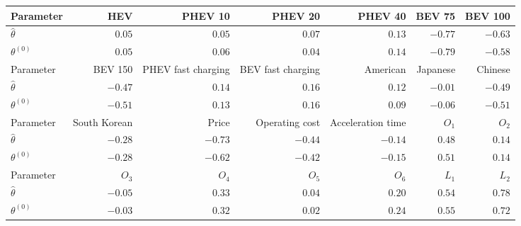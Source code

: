 \begin{tabular}{lrrrrrr}
\toprule
Parameter & HEV & PHEV 10 & PHEV 20 & PHEV 40 & BEV 75 & BEV 100 \\
\midrule
$\hat{\theta}$ & $0.05$ & $0.05$ & $0.07$ & $0.13$ & $-0.77$ & $-0.63$ \\
$\theta^{(0)}$ & $0.05$ & $0.06$ & $0.04$ & $0.14$ & $-0.79$ & $-0.58$ \\
\midrule
Parameter & BEV 150 & PHEV fast charging & BEV fast charging & American & Japanese & Chinese \\
\midrule
$\hat{\theta}$ & $-0.47$ & $0.14$ & $0.16$ & $0.12$ & $-0.01$ & $-0.49$ \\
$\theta^{(0)}$ & $-0.51$ & $0.13$ & $0.16$ & $0.09$ & $-0.06$ & $-0.51$ \\
\midrule
Parameter & South Korean & Price & Operating cost & Acceleration time & $O_{1}$ & $O_{2}$ \\
\midrule
$\hat{\theta}$ & $-0.28$ & $-0.73$ & $-0.44$ & $-0.14$ & $0.48$ & $0.14$ \\
$\theta^{(0)}$ & $-0.28$ & $-0.62$ & $-0.42$ & $-0.15$ & $0.51$ & $0.14$ \\
\midrule
Parameter & $O_{3}$ & $O_{4}$ & $O_{5}$ & $O_{6}$ & $L_{1}$ & $L_{2}$ \\
\midrule
$\hat{\theta}$ & $-0.05$ & $0.33$ & $0.04$ & $0.20$ & $0.54$ & $0.78$ \\
$\theta^{(0)}$ & $-0.03$ & $0.32$ & $0.02$ & $0.24$ & $0.55$ & $0.72$ \\
\bottomrule
\end{tabular}
